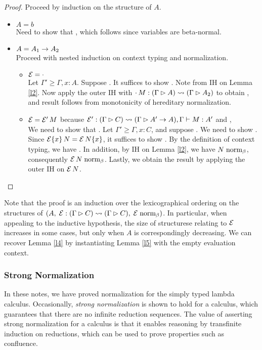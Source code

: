 \documentclass{article}
\begin{document}
\begin{proof}
Proceed by induction on the structure of $A$.
\begin{itemize}
  \setlength\itemsep{1em}
  \item $A = b$\\
  Need to show that , which follows since variables are beta-normal.
  \item $A = A_1 \to A_2$\\
  Proceed with nested induction on context typing and normalization.
  \begin{itemize}
  \setlength\itemsep{1em}
  \item $\mathcal{E} = \cdot$\\
  Let $\Gamma' \ge \Gamma,x:A$. Suppose . It suffices to show .
  Note  from IH on Lemma \ref{l2}.
  Now apply the outer IH with $\cdot\,M : (\Gamma \rhd A) \leadsto (\Gamma \rhd A_2)$ to obtain
  , and result follows from monotonicity of hereditary normalization.
  \item $\mathcal{E} = \mathcal{E}'\,M$ because $\hasC{\E'}{\Gamma}{C}{\Gamma}{\fn{A'}{A}}, \hasEF{\Gamma}{M}{A'}$ and
  , \\
  We need to show that . Let $\Gamma' \ge \Gamma,x:C$, and
  suppose . We need to show . Since
  $\mathcal{E}\{x\}\,N = \mathcal{E}\,N\{x\}$, it suffices to show .
  By the definition of context typing, we have . In addition,
  by IH on Lemma \ref{l2}, we have $N \mathrel{\text{norm}_\beta}$, consequently $\mathcal{E}\,N \mathrel{\text{norm}_\beta}$. Lastly, we obtain the result by applying the outer IH on $\mathcal{E}\,N$.
  \end{itemize}
\end{itemize}
\end{proof}

Note that the proof is an induction over the lexicographical ordering on the structures of
$(A,\; \mathcal{E} : (\Gamma \rhd C) \leadsto (\Gamma \rhd C),\; \mathcal{E} \mathrel{\text{norm}_\beta})$. In particular, when appealing to the inductive hypothesis,
the size of structurese relating to $\mathcal{E}$ increases in some cases, but only when $A$ is correspondingly decreasing. We can recover Lemma \ref{l4} by instantiating Lemma \ref{l5} with the empty evaluation context.

\subsubsection{Strong Normalization}

In these notes, we have proved normalization for the simply typed lambda calculus.
Occasionally, \emph{strong normalization} is shown to hold for a calculus, which guarantees
that there are no infinite reduction sequences. The value of asserting strong normalization
for a calculus is that it enables reasoning by transfinite induction on reductions, which can be used to prove
properties such as confluence.



\end{document}
